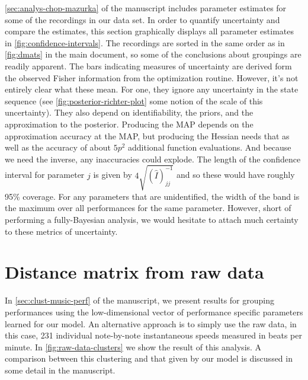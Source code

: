 \documentclass[aoas]{imsart}
\begin{document}
\autoref{sec:analys-chop-mazurka} of the manuscript includes parameter
estimates for some of the recordings in our data set. In order to
quantify uncertainty and compare the estimates, this section graphically
displays all parameter estimates in \autoref{fig:confidence-intervals}.
The recordings are sorted in the same order as in \autoref{fig:dmats} in
the main document, so some of the conclusions about groupings are
readily apparent. The bars indicating measures of uncertainty are
derived form the observed Fisher information from the optimization
routine. However, it's not entirely clear what these mean. For one, they
ignore any uncertainty in the state sequence (see
\autoref{fig:posterior-richter-plot} some notion of the scale of this
uncertainty). They also depend on identifiability, the priors, and the
approximation to the posterior. Producing the MAP depends on the
approximation accuracy at the MAP, but producing the Hessian needs that
as well as the accuracy of about \(5p^2\) additional function
evaluations. And because we need the inverse, any inaccuracies could
explode. The length of the confidence interval for parameter \(j\) is
given by \(4\sqrt{(\widehat{I})^{-1}_{jj}}\) and so these would have
roughly 95\% coverage. For any parameters that are unidentified, the
width of the band is the maximum over all performances for the same
parameter. However, short of performing a fully-Bayesian analysis, we
would hesitate to attach much certainty to these metrics of uncertainty.

\hypertarget{distance-matrix-from-raw-data}{%
\section{Distance matrix from raw
data}\label{distance-matrix-from-raw-data}}

In \autoref{sec:clust-music-perf} of the manuscript, we present results
for grouping performances using the low-dimensional vector of
performance specific parameters learned for our model. An alternative
approach is to simply use the raw data, in this case, 231 individual
note-by-note instantaneous speeds measured in beats per minute. In
\autoref{fig:raw-data-clusters} we show the result of this analysis. A
comparison between this clustering and that given by our model is
discussed in some detail in the manuscript.
\end{document}
